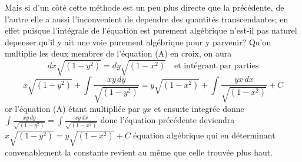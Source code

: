 \documentclass[11pt,a4paper]{article}
\begin{document}
Mais si d'un côté cette méthode est un peu plus directe que la
précédente, de l'autre elle a aussi l'inconvenient de dependre des
quantités transcendantes; en effet puisque l'intégrale de l'équation
est purement algébrique n'est-il pas naturel depenser qu'il y ait
une voie  purement algébrique pour y parvenir?
Qu'on multiplie les deux membres de l'équation (A) en croix, on aura
\[ dx\sqrt{(1-y^{2})} = dy\sqrt{(1-x^{2})} \quad \text{et intégrant par parties} \]
\[ x\sqrt{(1-y^{2})} + \int\frac{xy\,dy}{\sqrt{(1-y^{2})}} = y\sqrt{(1-x^{2})} + \int\frac{yx\,dx}{\sqrt{(1-x^{2})}} + C \]
or l'équation (A) étant multipliée par $yx$ et ensuite integrée donne
$\int\frac{xy\,dy}{\sqrt{(1-y^{2})}} = \int\frac{xy\,dx}{\sqrt{(1-x^{2})}}$ donc l'équation précédente deviendra $x\sqrt{(1-y^{2})} = y\sqrt{(1-x^{2})} + C$
équation algébrique qui en déterminant convenablement la constante revient au
même que celle trouvée plus haut.


\end{document}
